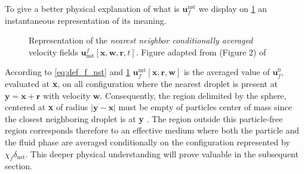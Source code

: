 To give a better physical explanation of what is $\textbf{u}_f^\text{nst}$ we display on \ref{fig:unst} an instantaneous representation of its meaning. 
\begin{figure}[h!]
    \centering
{} 
\caption{Representation of the \textit{nearest neighbor conditionally averaged} velocity fields $\textbf{u}_\text{nst}^f[\textbf{x},\textbf{w},\textbf{r},t]$.
Figure adapted from (Figure 2) of \citet{zhang2021ensemble}}
\label{fig:unst}
\end{figure}
According to \ref{eq:def_f_nst} and \ref{fig:unst} $\textbf{u}_f^\text{nst}[\textbf{x},\textbf{r},\textbf{w}]$ is the averaged value of $\textbf{u}_f^0$, evaluated at \textbf{x}, on all configuration where the nearest droplet is present at $\textbf{y} = \textbf{x} + \textbf{r}$ with velocity $\textbf{w}$. 
Consequently, the region delimited by the sphere, centered at \textbf{x} of radius $|\textbf{y} - \textbf{x}|$ must be empty of particles center of mass since the closest neighboring droplet is at \textbf{y} \citep{zhang2021ensemble}. 
The region outside this particle-free region corresponds therefore to an effective medium where both the particle and the fluid phase are averaged conditionally on the configuration represented by $\chi_f\delta_\text{nst}$. 
This deeper physical understanding will prove valuable in the subsequent section.  

